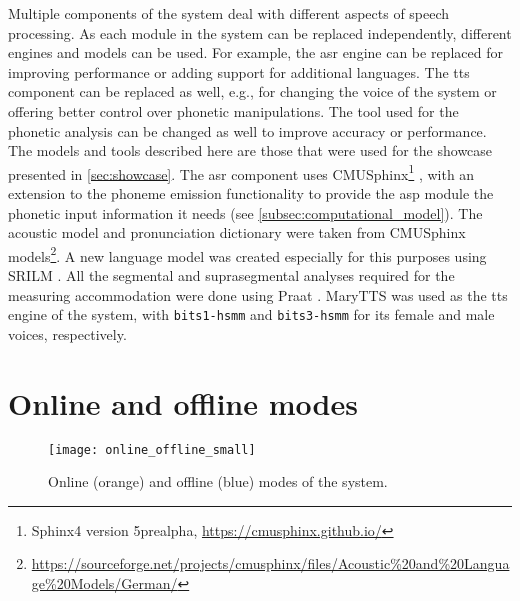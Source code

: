 Multiple components of the system deal with different aspects of speech processing.
As each module in the system can be replaced independently, different engines and models can be used.
For example, the \ac{asr} engine can be replaced for improving performance or adding support for additional languages.
The \ac{tts} component can be replaced as well, e.g., for changing the voice of the system or offering better control over phonetic manipulations.
The tool used for the phonetic analysis can be changed as well to improve accuracy or performance.
The models and tools described here are those that were used for the showcase presented in \cref{sec:showcase}.
The \ac{asr} component uses CMUSphinx\footnote{Sphinx4 version 5prealpha, \url{https://cmusphinx.github.io/}} \citep{Lamere2003sphinx}, with an extension to the phoneme emission functionality to provide the \ac{asp} module the phonetic input information it needs (see \cref{subsec:computational_model}).
The acoustic model and pronunciation dictionary were taken from CMUSphinx models\footnote{\url{https://sourceforge.net/projects/cmusphinx/files/Acoustic\%20and\%20Language\%20Models/German/}}.
A new language model was created especially for this purposes using SRILM \citep{Stolcke2002SRILM}.
All the segmental and suprasegmental analyses required for the measuring accommodation were done using Praat \citep{Boersma2018praat}.
MaryTTS \citep{LeMaguer2017uprooted, Schroeder2003mary} was used as the \ac{tts} engine of the system, with \texttt{bits1-hsmm} and \texttt{bits3-hsmm} for its female and male voices, respectively.

\section{Online and offline modes}
\label{sec:online_and_offline_modes}

\begin{figure}[t]
	\centering
	\texttt{[image: online\_offline\_small]}
	\caption[Online and offline modes of the responsive \acl{sds}]
		{Online (orange) and offline (blue) modes of the system.}
	\label{fig:online_offline_modes}
\end{figure}

